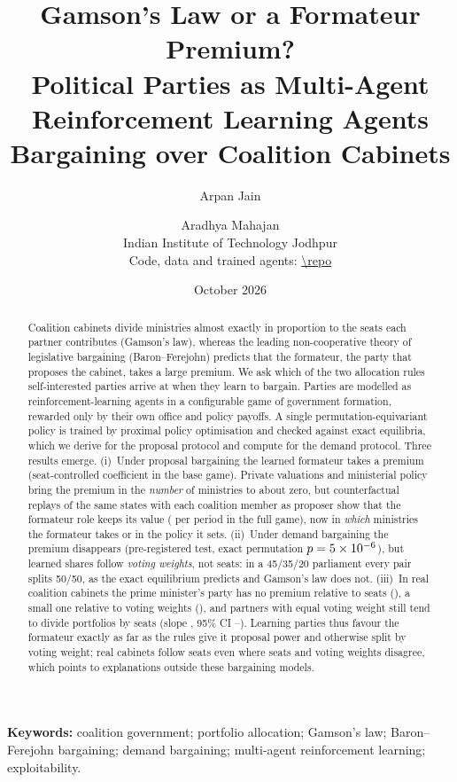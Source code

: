 \documentclass[11pt,a4paper]{article}
\title{\textbf{Gamson's Law or a Formateur Premium?}\\[2pt]
\large Political Parties as Multi-Agent Reinforcement Learning Agents\\Bargaining over Coalition Cabinets}
\author{Arpan Jain \and Aradhya Mahajan\\[3pt]
\small Indian Institute of Technology Jodhpur\\
\small Code, data and trained agents: \url{\repo}}
\date{October 2026}
\begin{document}
\maketitle

\begin{abstract}
\noindent Coalition cabinets divide ministries almost exactly in proportion to the seats each partner
contributes (Gamson's law), whereas the leading non-cooperative theory of legislative bargaining
(Baron--Ferejohn) predicts that the formateur, the party that proposes the cabinet, takes a large premium.
We ask which of the two allocation rules self-interested parties arrive at when they learn to bargain.
Parties are modelled as reinforcement-learning agents in a configurable game of government formation,
rewarded only by their own office and policy payoffs. A single permutation-equivariant policy is trained
by proximal policy optimisation and checked against exact equilibria, which we derive for the proposal
protocol and compute for the demand protocol. Three results emerge. (i)~Under proposal bargaining the learned formateur takes a premium (seat-controlled coefficient
\BaseGamma{} in the base game). Private valuations and ministerial policy bring the premium in the \emph{number} of ministries to about
zero, but counterfactual replays of the same states with each coalition member as proposer show that the
formateur role keeps its value (\PsiEstar{} per period in the full game), now in \emph{which} ministries
the formateur takes or in the policy it sets. (ii)~Under demand bargaining the premium
disappears (pre-registered test, exact permutation $p=5\times10^{-6}$), but learned shares follow
\emph{voting weights}, not seats: in a 45/35/20 parliament every pair splits 50/50, as the exact
equilibrium predicts and Gamson's law does not. (iii)~In \RealN{} real coalition cabinets the prime
minister's party has no premium relative to seats (\RealG), a small one relative to voting weights
(\RobWeightsG), and partners with equal voting weight still tend to divide portfolios by seats (slope \WvsSlope,
95\% CI \WvsLo--\WvsHi).
Learning parties thus favour the formateur exactly as far as the rules give it proposal power and
otherwise split by voting weight; real cabinets follow seats even where seats and voting weights disagree,
which points to explanations outside these bargaining models.
\end{abstract}

\noindent\textbf{Keywords:} coalition government; portfolio allocation; Gamson's law; Baron--Ferejohn
bargaining; demand bargaining; multi-agent reinforcement learning; exploitability.
\end{document}
